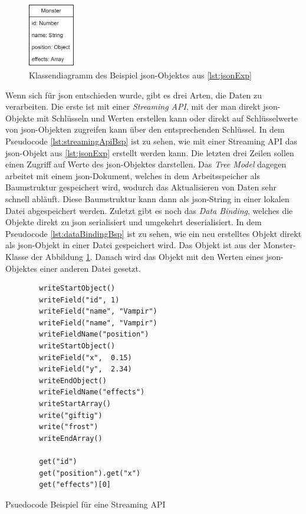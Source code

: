 \begin{figure}[htp]
    \centering
    \includegraphics[width=0.18\textwidth]{images/MonsterBspKlasse.png}
    \caption{Klassendiagramm des Beispiel \ac{json}-Objektes aus \ref{lst:jsonExp}}
    \label{fig:monsterBspKlasse}
\end{figure}

Wenn sich für \ac{json} entschieden wurde, gibt es drei Arten, die Daten zu verarbeiten. Die erste ist mit einer \textit{Streaming API}, mit der man direkt \ac{json}-Objekte mit Schlüsseln und Werten erstellen kann oder direkt auf Schlüsselwerte von \ac{json}-Objekten zugreifen kann über den  entsprechenden Schlüssel. In dem Pseudocode \ref{lst:streamingApiBsp} ist zu sehen, wie mit einer Streaming API das \ac{json}-Objekt aus \ref{lst:jsonExp} erstellt werden kann. Die letzten drei Zeilen sollen einen Zugriff auf Werte des \ac{json}-Objektes darstellen.\cite{tutorialspointJacksonStreaming} Das \textit{Tree Model} dagegen arbeitet mit einem \ac{json}-Dokument, welches in dem Arbeitsspeicher als Baumstruktur gespeichert wird, wodurch das Aktualisieren von Daten sehr schnell abläuft. Diese Baumstruktur kann dann als \ac{json}-String in einer lokalen Datei abgespeichert werden. Zuletzt gibt es noch das \textit{Data Binding}, welches die Objekte direkt zu \ac{json} serialisiert und umgekehrt deserialisiert. In dem Pseudocode \ref{lst:dataBindingBsp} ist zu sehen, wie ein neu erstelltes Objekt direkt als \ac{json}-Objekt in einer Datei gespeichert wird. Das Objekt ist aus der Monster-Klasse der Abbildung \ref{fig:monsterBspKlasse}. Danach wird das Objekt mit den Werten eines \ac{json}-Objektes einer anderen Datei gesetzt.\cite{tutorialspointJacksonData}\cite{tutorialspointJacksonOverview}

\begin{listing}[htp]
    \begin{verbatim} 
        writeStartObject()
        writeField("id", 1)
        writeField("name", "Vampir")
        writeField("name", "Vampir")
        writeFieldName("position")
        writeStartObject()
        writeField("x",  0.15) 
        writeField("y",  2.34) 
        writeEndObject()
        writeFieldName("effects")
        writeStartArray()
        write("giftig") 
        write("frost")
        writeEndArray()

        get("id")
        get("position").get("x")
        get("effects")[0]
    \end{verbatim}
    \caption{Psuedocode Beispiel für eine Streaming API}
    \label{lst:streamingApiBsp}
\end{listing}

